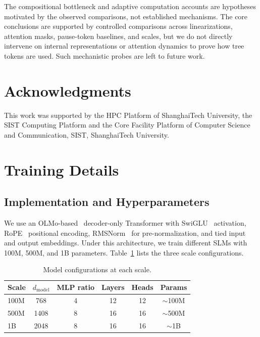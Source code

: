 \documentclass[11pt]{article}
\begin{document}
The compositional bottleneck and adaptive computation accounts are hypotheses motivated by the observed comparisons, not established mechanisms. The core conclusions are supported by controlled comparisons across linearizations, attention masks, pause-token baselines, and scales, but we do not directly intervene on internal representations or attention dynamics to prove how tree tokens are used. Such mechanistic probes are left to future work.


\section*{Acknowledgments}
This work was supported by the HPC Platform of ShanghaiTech University, the SIST Computing Platform and the Core Facility Platform of Computer Science and Communication, SIST, ShanghaiTech University. 




\appendix

\section{Training Details}
\label{sec:training}

\subsection{Implementation and Hyperparameters}

We use an OLMo-based~\cite{groeneveld-etal-2024-olmo} decoder-only Transformer with SwiGLU~\cite{shazeer2020gluSWIGLU} activation, RoPE~\cite{su2024roformerROPE} positional encoding, RMSNorm~\cite{zhang2019rootRMS} for pre-normalization, and tied input and output embeddings.
Under this architecture, we train different SLMs with 100M, 500M, and 1B parameters. Table~\ref{tab:scales} lists the three scale configurations.

\begin{table}[htbp]
  \centering
  \small
  \setlength{\tabcolsep}{3pt}
  \begin{tabular}{lccccc}
    \toprule
    Scale & $d_\text{model}$ & MLP ratio & Layers & Heads & Params \\
    \midrule
    100M & 768 & 4 & 12 & 12 & $\sim$100M \\
    500M & 1408 & 8 & 16 & 16 & $\sim$500M \\
    1B & 2048 & 8 & 16 & 16 & $\sim$1B \\
    \bottomrule
  \end{tabular}
  \caption{Model configurations at each scale.}
  \label{tab:scales}
\end{table}
\end{document}
